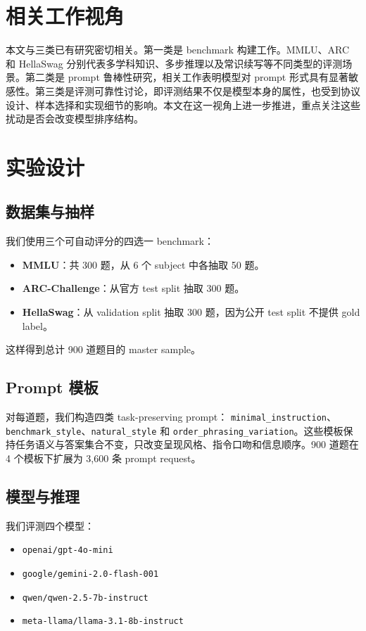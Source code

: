 \documentclass[11pt,a4paper]{ctexart}
\begin{document}
\section{相关工作视角}

本文与三类已有研究密切相关。第一类是 benchmark 构建工作。MMLU、ARC 和 HellaSwag 分别代表多学科知识、多步推理以及常识续写等不同类型的评测场景。第二类是 prompt 鲁棒性研究，相关工作表明模型对 prompt 形式具有显著敏感性。第三类是评测可靠性讨论，即评测结果不仅是模型本身的属性，也受到协议设计、样本选择和实现细节的影响。本文在这一视角上进一步推进，重点关注这些扰动是否会改变模型排序结构。

\section{实验设计}

\subsection{数据集与抽样}

我们使用三个可自动评分的四选一 benchmark：
\begin{itemize}[leftmargin=1.5em]
\item \textbf{MMLU}：共 300 题，从 6 个 subject 中各抽取 50 题。
\item \textbf{ARC-Challenge}：从官方 test split 抽取 300 题。
\item \textbf{HellaSwag}：从 validation split 抽取 300 题，因为公开 test split 不提供 gold label。
\end{itemize}
这样得到总计 900 道题目的 master sample。

\subsection{Prompt 模板}

对每道题，我们构造四类 task-preserving prompt：
\texttt{minimal\_instruction}、\texttt{benchmark\_style}、\texttt{natural\_style} 和 \texttt{order\_phrasing\_variation}。这些模板保持任务语义与答案集合不变，只改变呈现风格、指令口吻和信息顺序。900 道题在 4 个模板下扩展为 3,600 条 prompt request。

\subsection{模型与推理}

我们评测四个模型：
\begin{itemize}[leftmargin=1.5em]
\item \texttt{openai/gpt-4o-mini}
\item \texttt{google/gemini-2.0-flash-001}
\item \texttt{qwen/qwen-2.5-7b-instruct}
\item \texttt{meta-llama/llama-3.1-8b-instruct}
\end{itemize}
\end{document}
